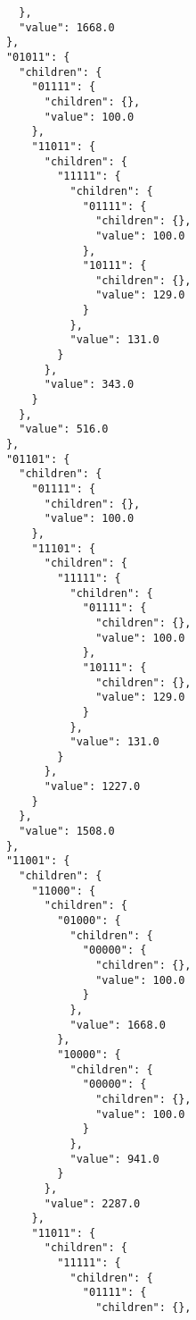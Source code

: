 \documentclass{article}
\begin{document}
\begin{listing}
\begin{verbatim}
              },
              "value": 1668.0
            },
            "01011": {
              "children": {
                "01111": {
                  "children": {},
                  "value": 100.0
                },
                "11011": {
                  "children": {
                    "11111": {
                      "children": {
                        "01111": {
                          "children": {},
                          "value": 100.0
                        },
                        "10111": {
                          "children": {},
                          "value": 129.0
                        }
                      },
                      "value": 131.0
                    }
                  },
                  "value": 343.0
                }
              },
              "value": 516.0
            },
            "01101": {
              "children": {
                "01111": {
                  "children": {},
                  "value": 100.0
                },
                "11101": {
                  "children": {
                    "11111": {
                      "children": {
                        "01111": {
                          "children": {},
                          "value": 100.0
                        },
                        "10111": {
                          "children": {},
                          "value": 129.0
                        }
                      },
                      "value": 131.0
                    }
                  },
                  "value": 1227.0
                }
              },
              "value": 1508.0
            },
            "11001": {
              "children": {
                "11000": {
                  "children": {
                    "01000": {
                      "children": {
                        "00000": {
                          "children": {},
                          "value": 100.0
                        }
                      },
                      "value": 1668.0
                    },
                    "10000": {
                      "children": {
                        "00000": {
                          "children": {},
                          "value": 100.0
                        }
                      },
                      "value": 941.0
                    }
                  },
                  "value": 2287.0
                },
                "11011": {
                  "children": {
                    "11111": {
                      "children": {
                        "01111": {
                          "children": {},

\end{verbatim}
\end{listing}
\end{document}
